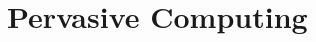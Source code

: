 \documentclass[\main/notes.tex]{subfiles}
\begin{document}
	\setcounter{chapter}{9}
	\chapter{Pervasive Computing}
	\vbox{}
\end{document}
